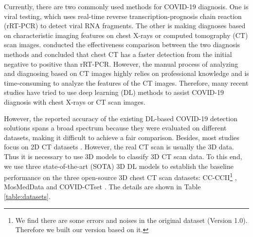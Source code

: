 \documentclass[letterpaper]{article}
\begin{document}
Currently, there are two commonly used methods for COVID-19 diagnosis. One is viral testing, which uses real-time reverse transcription-prognosis chain reaction (rRT-PCR) to detect viral RNA fragments. The other is making diagnoses based on characteristic imaging features on chest X-rays or computed tomography (CT) scan images. \cite{corr_ct_pcr} conducted the effectiveness comparison between the two diagnosis methods and concluded that chest CT has a faster detection from the initial negative to positive than rRT-PCR. However, the manual process of analyzing and diagnosing based on CT images highly relies on professional knowledge and is time-consuming to analyze the features of the CT images. Therefore, many recent studies have tried to use deep learning (DL) methods to assist COVID-19 diagnosis with chest X-rays or CT scan images.

However, the reported accuracy of the existing DL-based COVID-19 detection solutions spans a broad spectrum because they were evaluated on different datasets, making it difficult to achieve a fair comparison. Besides, most studies focus on 2D CT datasets \cite{Singh2020,Ardakani2020,Alom}. However, the real CT scan is usually the 3D data. Thus it is necessary to use 3D models to classify 3D CT scan data. To this end, we use three state-of-the-art (SOTA) 3D DL models to establish the baseline performance on the three open-source 3D chest CT scan datasets:  CC-CCII\footnote{We find there are some errors and noises in the original dataset (Version 1.0). Therefore we built our version based on it.} \cite{cell_covid}, MosMedData \cite{mosmeddata} and COVID-CTset \cite{covid-ctset}. The details are shown in Table \ref{table:datasets}.
\end{document}
